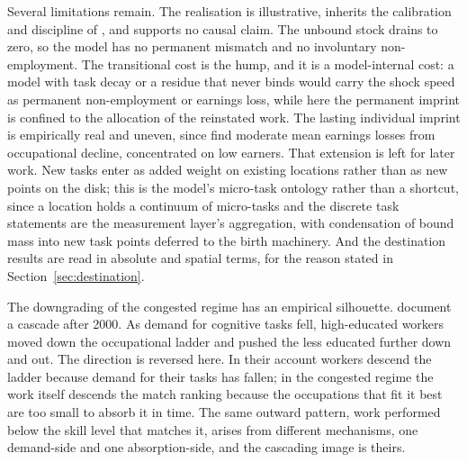 \documentclass[12pt, a4paper]{article}
\begin{document}
Several limitations remain. The realisation is illustrative, inherits
the calibration and discipline of \textcite{storck2026fields}, and
supports no causal claim. The unbound stock drains to zero, so the
model has no permanent mismatch and no involuntary non-employment. The
transitional cost is the hump, and it is a model-internal cost: a model
with task decay or a residue that never binds would carry the shock
speed as permanent non-employment or earnings loss, while here the
permanent imprint is confined to the allocation of the reinstated work.
The lasting individual imprint is empirically real and uneven,
since \textcite{edin2023individual} find moderate mean earnings losses
from occupational decline, concentrated on low earners. That extension
is left for later work. New tasks enter as added weight on existing
locations rather than as new points on the disk; this is the model's
micro-task ontology rather than a shortcut, since a location holds a
continuum of micro-tasks and the discrete task statements are the
measurement layer's aggregation, with condensation of bound mass into
new task points deferred to the birth machinery. And the destination
results are read in absolute and spatial terms, for the reason stated
in Section~\ref{sec:destination}.

The downgrading of the congested regime has an empirical silhouette.
\textcite{beaudry2016great} document a cascade after 2000. As demand
for cognitive tasks fell, high-educated workers moved down the
occupational ladder and pushed the less educated further down and
out. The direction
is reversed here. In their account workers descend the ladder because
demand for their tasks has fallen; in the congested regime the work itself
descends the match ranking because the occupations that fit it best are
too small to absorb it in time. The same outward pattern, work performed below the skill level that
matches it, arises from different mechanisms, one demand-side and one
absorption-side, and the cascading image is theirs.
\end{document}
